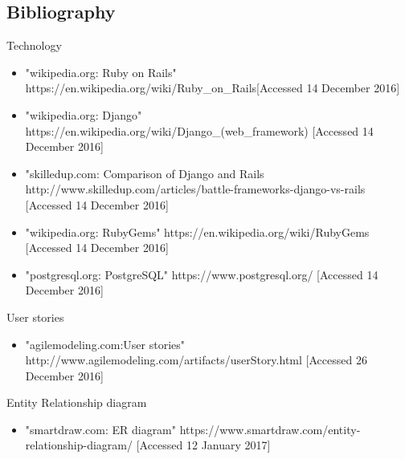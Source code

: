 \documentclass{l3proj}
\begin{document}
\subsection{Bibliography}
\label{Bibliography}


\label{tech}
Technology
\begin{itemize}

\item "wikipedia.org: Ruby on Rails"
\newline https://en.wikipedia.org/wiki/Ruby\_on\_Rails[Accessed 14 December 2016]

\item "wikipedia.org: Django"
\newline https://en.wikipedia.org/wiki/Django\_(web\_framework) [Accessed 14 December 2016]

\item "skilledup.com: Comparison of Django and Rails
\newline http://www.skilledup.com/articles/battle-frameworks-django-vs-rails [Accessed 14 December 2016]

\item "wikipedia.org: RubyGems"
\newline https://en.wikipedia.org/wiki/RubyGems [Accessed 14 December 2016]

\item "postgresql.org: PostgreSQL"
\newline https://www.postgresql.org/ [Accessed 14 December 2016]


\end{itemize}




\label{user_stories}

User stories

\begin{itemize}

\item "agilemodeling.com:User stories"
\newline http://www.agilemodeling.com/artifacts/userStory.html [Accessed 26 December 2016]

\end{itemize}


\label{er}
Entity Relationship diagram

\begin{itemize}

\item "smartdraw.com: ER diagram"
\newline https://www.smartdraw.com/entity-relationship-diagram/ [Accessed 12 January 2017]

\end{itemize}
\end{document}

